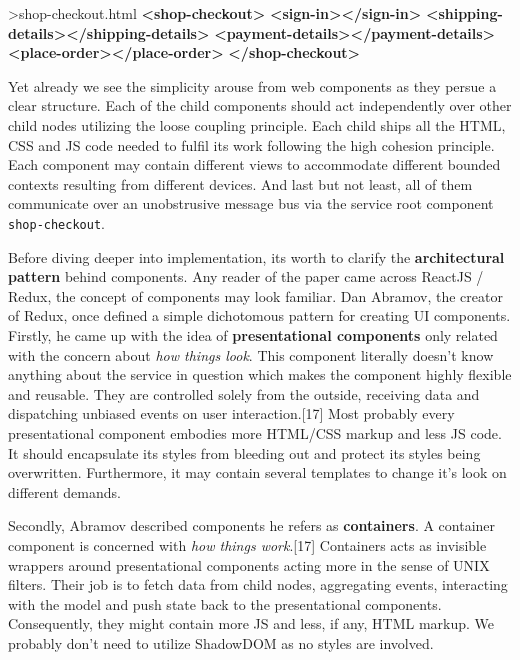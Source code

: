 \documentclass[]{article}
\newenvironment{Shaded}{}{}
\newcommand{\KeywordTok}[1]{\textcolor[rgb]{0.00,0.44,0.13}{\textbf{{#1}}}}
\newcommand{\NormalTok}[1]{{#1}}
\begin{document}
\begin{Shaded}
\begin{Highlighting}[]
\NormalTok{>shop-checkout.html}
\KeywordTok{<shop-checkout>}
  \KeywordTok{<sign-in></sign-in>}
  \KeywordTok{<shipping-details></shipping-details>}
  \KeywordTok{<payment-details></payment-details>}
  \KeywordTok{<place-order></place-order>}
\KeywordTok{</shop-checkout>}
\end{Highlighting}
\end{Shaded}

Yet already we see the simplicity arouse from web components as they
persue a clear structure. Each of the child components should act
independently over other child nodes utilizing the loose coupling
principle. Each child ships all the HTML, CSS and JS code needed to
fulfil its work following the high cohesion principle. Each component
may contain different views to accommodate different bounded contexts
resulting from different devices. And last but not least, all of them
communicate over an unobstrusive message bus via the service root
component \texttt{shop-checkout}.

Before diving deeper into implementation, its worth to clarify the
\textbf{architectural pattern} behind components. Any reader of the
paper came across ReactJS / Redux, the concept of components may look
familiar. Dan Abramov, the creator of Redux, once defined a simple
dichotomous pattern for creating UI components. Firstly, he came up with
the idea of \textbf{presentational components} only related with the
concern about \emph{how things look}. This component literally doesn't
know anything about the service in question which makes the component
highly flexible and reusable. They are controlled solely from the
outside, receiving data and dispatching unbiased events on user
interaction.{[}17{]} Most probably every presentational component
embodies more HTML/CSS markup and less JS code. It should encapsulate
its styles from bleeding out and protect its styles being overwritten.
Furthermore, it may contain several templates to change it's look on
different demands.

Secondly, Abramov described components he refers as \textbf{containers}.
A container component is concerned with \emph{how things work}.{[}17{]}
Containers acts as invisible wrappers around presentational components
acting more in the sense of UNIX filters. Their job is to fetch data
from child nodes, aggregating events, interacting with the model and
push state back to the presentational components. Consequently, they
might contain more JS and less, if any, HTML markup. We probably don't
need to utilize ShadowDOM as no styles are involved.
\end{document}
